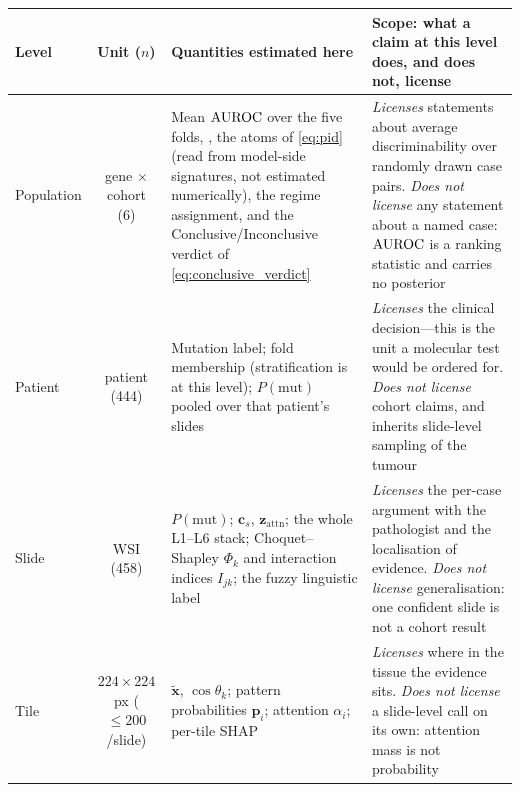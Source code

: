 \footnotesize
\setlength{\tabcolsep}{4pt}
\renewcommand{\arraystretch}{1.15}
\begin{tabularx}{\linewidth}{l c X X}
\toprule
\textbf{Level} & \textbf{Unit ($n$)} &
  \textbf{Quantities estimated here} &
  \textbf{Scope: what a claim at this level does, and does not, license} \\
\midrule
Population
  & gene $\times$ cohort (6)
  & Mean $\text{AUROC}$ over the five folds, \auprc{}, the \pid{} atoms of
    \cref{eq:pid} (read from model-side signatures, not estimated
    numerically), the regime assignment, and the
    Conclusive/Inconclusive verdict of \cref{eq:conclusive_verdict}
  & \emph{Licenses} statements about average discriminability over
    randomly drawn case pairs. \emph{Does not license} any statement
    about a named case: $\text{AUROC}$ is a ranking statistic and carries
    no posterior \\
\midrule
Patient
  & patient (444)
  & Mutation label; fold membership (stratification is at this level);
    $P(\mathrm{mut})$ pooled over that patient's slides
  & \emph{Licenses} the clinical decision---this is the unit a
    molecular test would be ordered for. \emph{Does not license}
    cohort claims, and inherits slide-level sampling of the tumour \\
\midrule
Slide
  & WSI (458)
  & $P(\mathrm{mut})$; $\mathbf{c}_s$, $\mathbf{z}_{\mathrm{attn}}$;
    the whole L1--L6 stack; Choquet--Shapley $\Phi_k$ and interaction
    indices $I_{jk}$; the fuzzy linguistic label
  & \emph{Licenses} the per-case argument with the pathologist and
    the localisation of evidence. \emph{Does not license}
    generalisation: one confident slide is not a cohort result \\
\midrule
Tile
  & $224\!\times\!224$ px ($\leq\!200$/slide)
  & $\tilde{\mathbf{x}}$, $\cos\theta_k$; pattern probabilities
    $\mathbf{p}_i$; attention $\alpha_i$; per-tile SHAP
  & \emph{Licenses} where in the tissue the evidence sits.
    \emph{Does not license} a slide-level call on its own: attention
    mass is not probability \\
\bottomrule
\end{tabularx}
